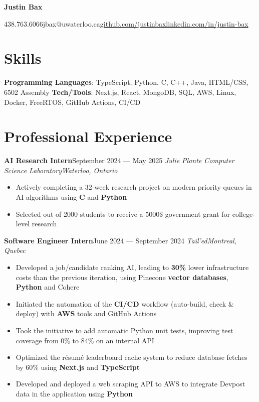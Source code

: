 \documentclass{article}
\newcommand{\cdelim}{\;\textbar\;}
\newcommand{\newrole}[4]{
    {\normalfont\textbf{#1}\hfill#3}
    \newline
    \textit{#2}\hfill\textit{#4}
}
\newenvironment{bulletpoints}{\begin{itemize}\setlength\itemsep{-0.2em}}{\end{itemize}}
\begin{document}
\begin{center}
    {\Huge\bfseries Justin Bax}\\\vspace*{2pt}

    438.763.6066\cdelim jbax@uwaterloo.ca\cdelim\href{https://github.com/justinbax}{github.com/justinbax}\cdelim\href{https://linkedin.com/in/justin-bax}{linkedin.com/in/justin-bax}\\
\end{center}

\section*{Skills}

{\bfseries Programming Languages}: TypeScript, Python, C, C++, Java, HTML/CSS, 6502 Assembly
\newline
{\bfseries Tech/Tools}: Next.js, React, MongoDB, SQL, AWS, Linux, Docker, FreeRTOS, GitHub Actions, CI/CD


\section*{Professional Experience}

\newrole{AI Research Intern}{Julie Plante Computer Science Laboratory}{September 2024 --- May 2025}{Waterloo, Ontario}
\begin{bulletpoints}
    \item Actively completing a 32-week research project on modern priority queues in AI algorithms using \textbf{C} and \textbf{Python}
    \item Selected out of 2000 students to receive a 5000\$ government grant for college-level research
\end{bulletpoints}

\newrole{Software Engineer Intern}{Tail'ed}{June 2024 --- September 2024}{Montreal, Quebec}
\begin{bulletpoints}
    \item Developed a job/candidate ranking AI, leading to \textbf{30\%} lower infrastructure costs than the previous iteration, using Pinecone \textbf{vector databases}, \textbf{Python} and Cohere
    \item Initiated the automation of the \textbf{CI/CD} workflow (auto-build, check \& deploy) with \textbf{AWS} tools and GitHub Actions
    \item Took the initiative to add automatic Python unit tests, improving test coverage from 0\% to 84\% on an internal API
    \item Optimized the résumé leaderboard cache system to reduce database fetches by 60\% using \textbf{Next.js} and \textbf{TypeScript}
    \item Developed and deployed a web scraping API to AWS to integrate Devpost data in the application using \textbf{Python}
\end{bulletpoints}
\end{document}
